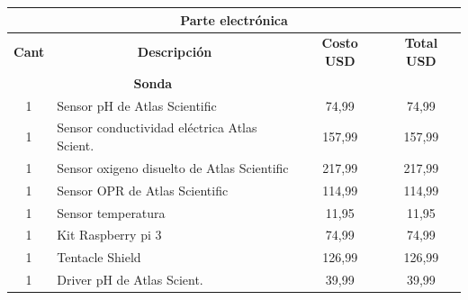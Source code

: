 \begin{appendices}
\begin{table}[t]
\begin{tabular}{clcc}
\multicolumn{4}{|c|}{\textbf{Parte electrónica}}                                                                                                                                                      \\ \hline
\multicolumn{1}{|r|}{\textbf{Cant}} & \multicolumn{1}{c|}{\textbf{Descripción}}                               & \multicolumn{1}{c|}{\textbf{Costo USD}} & \multicolumn{1}{c|}{\textbf{Total USD}} \\ \hline
\multicolumn{2}{|c|}{\textbf{Sonda}}                                                                              & \multicolumn{2}{c|}{}                                                             \\ \hline
\multicolumn{1}{|c|}{1}                 & \multicolumn{1}{l|}{Sensor pH de Atlas Scientific}                      & \multicolumn{1}{c|}{74,99}              & \multicolumn{1}{c|}{74,99}              \\ \hline
\multicolumn{1}{|c|}{1}                 & \multicolumn{1}{l|}{Sensor conductividad eléctrica Atlas Scient.} & \multicolumn{1}{c|}{157,99}             & \multicolumn{1}{c|}{157,99}             \\ \hline
\multicolumn{1}{|c|}{1}                 & \multicolumn{1}{l|}{Sensor oxigeno disuelto de Atlas Scientific}        & \multicolumn{1}{c|}{217,99}             & \multicolumn{1}{c|}{217,99}             \\ \hline
\multicolumn{1}{|c|}{1}                 & \multicolumn{1}{l|}{Sensor OPR de Atlas Scientific}                     & \multicolumn{1}{c|}{114,99}             & \multicolumn{1}{c|}{114,99}             \\ \hline
\multicolumn{1}{|c|}{1}                 & \multicolumn{1}{l|}{Sensor temperatura}                                 & \multicolumn{1}{c|}{11,95}              & \multicolumn{1}{c|}{11,95}              \\ \hline
\multicolumn{1}{|c|}{1}                 & \multicolumn{1}{l|}{Kit Raspberry pi 3}                                 & \multicolumn{1}{c|}{74,99}              & \multicolumn{1}{c|}{74,99}              \\ \hline
\multicolumn{1}{|c|}{1}                 & \multicolumn{1}{l|}{Tentacle Shield}                                    & \multicolumn{1}{c|}{126,99}             & \multicolumn{1}{c|}{126,99}             \\ \hline
\multicolumn{1}{|c|}{1}                 & \multicolumn{1}{l|}{Driver pH de Atlas Scient.}                      & \multicolumn{1}{c|}{39,99}              & \multicolumn{1}{c|}{39,99}              \\ \hline

\end{tabular}
\end{table}
\end{appendices}
